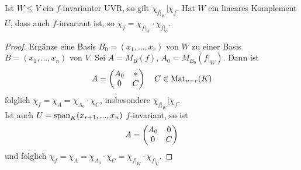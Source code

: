 \begin{lemma}
	Ist $W\le V$ ein $f$-invarianter UVR, so gilt $\chi_{f\vert_W}\vert \chi_f$. Hat $W$ ein lineares Komplement $U$, dass auch $f$-invariant ist, so $\chi_f=\chi_{f\vert_W}\cdot \chi_{f\vert_U}$.
\end{lemma}
\begin{proof}
	Ergänze eine Basis $B_0=(x_1,...,x_r)$ von $W$ zu einer Basis $B=(x_1,...,x_n)$ von $V$. Sei $A=M_B(f)$, $A_0=M_{B_0}(f\vert_W)$. Dann ist 
	\begin{align}
		A=\begin{pmatrix}A_0&*\\0&C\end{pmatrix}\quad C\in\operatorname{Mat}_{n-r}(K)\notag
	\end{align}
	folglich $\chi_f=\chi_A=\chi_{A_0}\cdot \chi_C$, insbesondere $\chi_{f\vert_W}\vert\chi_f$.\\
	Ist auch $U=\operatorname{span}_K(x_{r+1},...,x_n)$ $f$-invariant, so ist 
	\begin{align}
		A=\begin{pmatrix}A_0&0\\0&C\end{pmatrix}\notag
	\end{align}
	und folglich $\chi_f=\chi_A=\chi_{A_0}\cdot\chi_C=\chi_{f\vert_W}\cdot\chi_{f\vert_U}$.
\end{proof}

